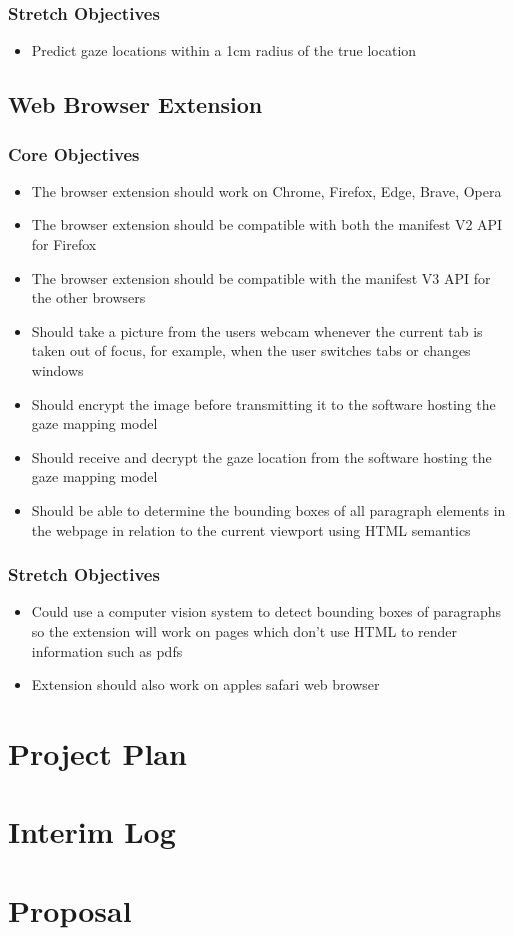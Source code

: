 \documentclass[twocolumn]{report}
\begin{document}
\subsection{Stretch Objectives}

\begin{itemize}
    \item Predict gaze locations within a 1cm radius of the true location
\end{itemize}

\section{Web Browser Extension}

\subsection{Core Objectives}

\begin{itemize}
    \item The browser extension should work on Chrome, Firefox, Edge, Brave, Opera
    \item The browser extension should be compatible with both the manifest V2 API for Firefox
    \item The browser extension should be compatible with the manifest V3 API for the other browsers 
    \item Should take a picture from the users webcam whenever the current tab is taken out of focus, for example, when the user switches tabs or changes windows 
    \item Should encrypt the image before transmitting it to the software hosting the gaze mapping model 
    \item Should receive and decrypt the gaze location from the software hosting the gaze mapping model 
    \item Should be able to determine the bounding boxes of all paragraph elements in the webpage in relation to the current viewport using HTML semantics
\end{itemize}

\subsection{Stretch Objectives}

\begin{itemize}
    \item Could use a computer vision system to detect bounding boxes of paragraphs so the extension will work on pages which don't use HTML to render information such as pdfs 
    \item Extension should also work on apples safari web browser  
\end{itemize}

\chapter{Project Plan}

\chapter{Interim Log}
\chapter{Proposal}

\printbibliography
\end{document}

